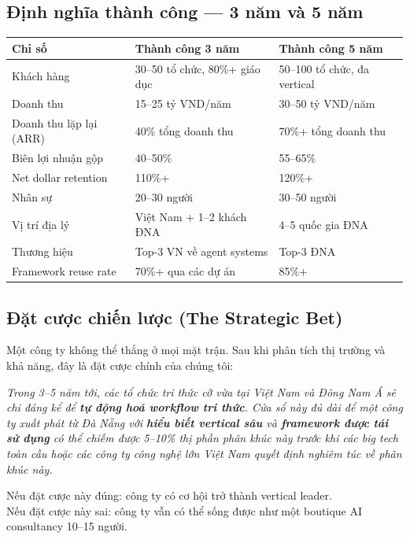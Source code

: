 \documentclass[11pt,a4paper]{article}
\begin{document}
\subsection{Định nghĩa thành công — 3 năm và 5 năm}

\begin{tabularx}{\linewidth}{@{}p{3.5cm} X X@{}}
\toprule
\textbf{Chỉ số} & \textbf{Thành công 3 năm} & \textbf{Thành công 5 năm} \\
\midrule
Khách hàng & 30--50 tổ chức, 80\%+ giáo dục & 50--100 tổ chức, đa vertical \\
Doanh thu & 15--25 tỷ VND/năm & 30--50 tỷ VND/năm \\
Doanh thu lặp lại (ARR) & 40\% tổng doanh thu & 70\%+ tổng doanh thu \\
Biên lợi nhuận gộp & 40--50\% & 55--65\% \\
Net dollar retention & 110\%+ & 120\%+ \\
Nhân sự & 20--30 người & 30--50 người \\
Vị trí địa lý & Việt Nam + 1--2 khách ĐNA & 4--5 quốc gia ĐNA \\
Thương hiệu & Top-3 VN về agent systems & Top-3 ĐNA \\
Framework reuse rate & 70\%+ qua các dự án & 85\%+ \\
\bottomrule
\end{tabularx}

\subsection{Đặt cược chiến lược (The Strategic Bet)}

Một công ty không thể thắng ở mọi mặt trận. Sau khi phân tích thị trường và khả
năng, đây là đặt cược chính của chúng tôi:

\begin{framebox_}[title=The Bet]
\textit{Trong 3--5 năm tới, các tổ chức tri thức cỡ vừa tại Việt Nam và Đông Nam
Á sẽ chi đáng kể để \textbf{tự động hoá workflow tri thức}. Cửa sổ này đủ dài để
một công ty xuất phát từ Đà Nẵng với \textbf{hiểu biết vertical sâu} và \textbf{
framework được tái sử dụng} có thể chiếm được 5--10\% thị phần phân khúc này trước
khi các big tech toàn cầu hoặc các công ty công nghệ lớn Việt Nam quyết định
nghiêm túc về phân khúc này.}
\end{framebox_}

Nếu đặt cược này đúng: công ty có cơ hội trở thành vertical leader.\\
Nếu đặt cược này sai: công ty vẫn có thể sống được như một boutique AI
consultancy 10--15 người.
\end{document}
